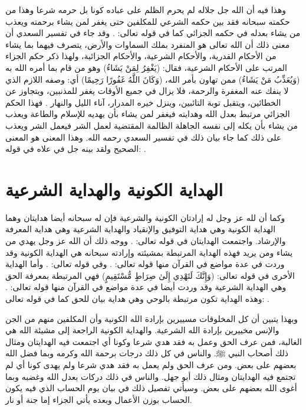 وهذا فيه أن الله جل جلاله لم يحرم الظلم على عباده كونا بل حرمه شرعا وهذا من حكمته سبحانه فقد بين حكمه الشرعي للمكلفين حتى يغفر لمن يشاء برحمته ويعذب من يشاء بعدله في حكمه الجزائي كما في قوله تعالى: 
\quranayah*[48][14]{\footnotesize \surahname*[48]}.  وقد جاء في تفسير السعدي أن معنى ذلك أن الله تعالى هو المنفرد بملك السماوات والأرض، يتصرف فيهما بما يشاء من الأحكام القدرية، والأحكام الشرعية، والأحكام الجزائية، ولهذا ذكر حكم الجزاء المرتب على الأحكام الشرعية، فقال: (يَغْفِرُ لِمَنْ يَشَاءُ) وهو من قام بما أمره الله به (وَيُعَذِّبُ مَنْ يَشَاءُ) ممن تهاون بأمر الله، (وَكَانَ اللَّهُ غَفُورًا رَحِيمًا) أي: وصفه اللازم الذي لا ينفك عنه المغفرة والرحمة، فلا يزال في جميع الأوقات يغفر للمذنبين، ويتجاوز عن الخطائين، ويتقبل توبة التائبين، وينزل خيره المدرار، آناء الليل والنهار \cite{tafsir_Saadi}. فهذا الحكم الجزائي مرتبط بعدل الله وهدايته فيغفر لمن يشاء بأن يهديه للإسلام والطاعة ويعذب من يشاء بأن يكله إلى نفسه الجاهلة الظالمة المقتضية لعمل الشر فيعمل الشر ويعذب على ذلك كما جاء بيان ذلك في تفسير السعدي رحمه الله. وهذا المعنى هو المعنى الصحيح ولقد بينه جل في علاه في قوله: \quranayah*[6][125]{\footnotesize \surahname*[6]}.

\section{الهداية الكونية والهداية الشرعية}

وكما أن لله عز وجل له إرادتان الكونية والشرعية فإن له سبحانه أيضا هدايتان وهما الهداية الكونية وهي هداية التوفيق والإنقياد والهداية الشرعية وهي هداية المعرفة والإرشاد. واجتمعت الهدايتان في قوله تعالى:
\quranayah*[42][52]{\footnotesize \surahname*[42]}. ووجه ذلك أن الله عز وجل يهدي من يشاء ومن يريد فهذه الهداية المرتبطة بمشيئته وإرادته سبحانه هي الهداية الكونية وقد وردت في عدة مواضع في القرآن منها قوله تعالى:
\quranayah*[28][56]{\footnotesize \surahname*[28]}. وفي قوله تعالى:
\quranayah*[22][16]{\footnotesize \surahname*[22]}. وأما الهداية الأخرى في قوله تعالى: (وَإِنَّكَ لَتَهْدِي إِلَىٰ صِرَاطٍ مُّسْتَقِيمٍ)
فهي المرتبطة بمعرفة الحق وهي الهداية الشرعية وقد وردت أيضا في عدة مواضع في القرآن منها قوله تعالى:
\quranayah*[4][26]{\footnotesize \surahname*[4]}. وهذه الهداية تكون مرتبطة بالوحي وهي هداية بيان للحق كما في قوله تعالى:
\quranayah*[34][6]{\footnotesize \surahname*[6]}.

وبهذا يتبين أن كل المخلوقات مسييرين بإرادة الله الكونية وأن المكلفين منهم من الجن والإنس مخييرين بإرادة الله الشرعية. والهداية الكونية الراجعة إلى مشيئة الله هي الغالبة، فمن عرف الحق وعمل به فقد هدي شرعا وكونا أي اجتمعت فيه الهدايتان ومثال ذلك أصحاب النبي ﷺ. والناس في كل ذلك درجات برحمة الله وكرمه وبما فضل الله بعضهم على بعض. ومن عرف الحق ولم يعمل به فقد هدي شرعا ولم يهدى كونا أي لم تجتمع فيه الهدايتان ومثال ذلك أبو جهل. والناس في ذلك دركات بعدل الله وغضبه وبما أغوى الله بعضهم على بعض. وسيأتي تفصيل ذلك في بيان يوم الحساب الذي فيه يكون الحساب بوزن الأعمال وبعده يأتي الجزاء إما جنة أو نار. 

